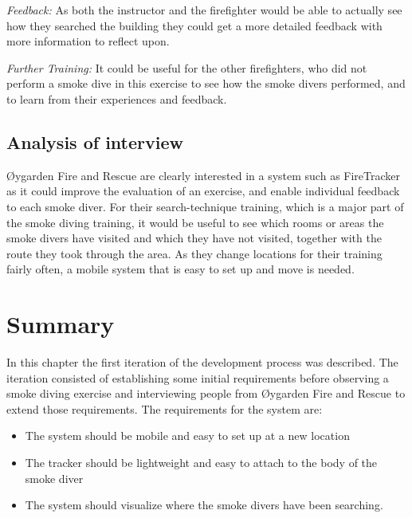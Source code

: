 \documentclass[../Main/thesis.tex]{subfiles}
\begin{document}
\textit{Feedback:}
As both the instructor and the firefighter would be able to actually see how they searched the building they could get a more detailed feedback with more information to reflect upon.

\textit{Further Training:}
It could be useful for the other firefighters, who did not perform a smoke dive in this exercise to see how the smoke divers performed, and to learn from their experiences and feedback.

\subsection{Analysis of interview}
Øygarden Fire and Rescue are clearly interested in a system such as FireTracker as it could improve the evaluation of an exercise, and enable individual feedback to each smoke diver.
For their search-technique training, which is a major part of the smoke diving training, it would be useful to see which rooms or areas the smoke divers have visited and which they have not visited, together with the route they took through the area.
As they change locations for their training fairly often, a mobile system that is easy to set up and move is needed.

\section{Summary}
In this chapter the first iteration of the development process was described.
The iteration consisted of establishing some initial requirements before observing a smoke diving exercise and interviewing people from Øygarden Fire and Rescue to extend those requirements.
The requirements for the system are:
\begin{itemize}
	\item The system should be mobile and easy to set up at a new location
	\item The tracker should be lightweight and easy to attach to the body of the smoke diver
	\item The system should visualize where the smoke divers have been searching. 
\end{itemize}
\end{document}
